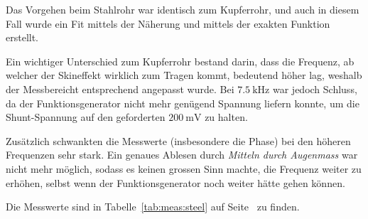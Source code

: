 {\begin{minipage}[t]{0.33\textwidth}
        Das Vorgehen beim Stahlrohr war  identisch zum Kupferrohr, und auch in
        diesem  Fall wurde  ein Fit  mittels  der N\"aherung  und mittels  der
        exakten Funktion erstellt.

        Ein  wichtiger  Unterschied zum  Kupferrohr  bestand  darin, dass  die
        Frequenz,  ab  welcher  der  Skineffekt  wirklich  zum  Tragen  kommt,
        bedeutend h\"oher lag, weshalb der Messbereicht entsprechend angepasst
        wurde. Bei   $\SI{7.5}{\kilo\hertz}$  war   jedoch  Schluss,   da  der
        Funktionsgenerator nicht  mehr gen\"ugend  Spannung liefern konnte, um
        die  Shunt-Spannung  auf  den geforderten  $\SI{200}{\milli\volt}$  zu
        halten.

        Zus\"atzlich  schwankten die  Messwerte (insbesondere  die Phase)  bei
        den  h\"oheren  Frequenzen  sehr   stark. Ein  genaues  Ablesen  durch
        \emph{Mitteln  durch Augenmass}  war nicht  mehr m\"oglich,  sodass es
        keinen grossen Sinn  machte, die Frequenz weiter  zu erh\"ohen, selbst
        wenn der Funktionsgenerator noch weiter h\"atte gehen k\"onnen.

        Die    Messwerte    sind     in    Tabelle~\ref{tab:meas:steel}    auf
        Seite~\pageref{tab:meas:steel} zu finden.

        \vspace{2em}
        \begin{minipage}[c][][b]{0.5\textwidth}
            \vspace{0pt}
            
        \end{minipage}%
        \begin{minipage}[c][][b]{0.5\textwidth}
            \resizebox{\textwidth}{!}{}
            \label{fig:st:freq:sensor}
        \end{minipage}
	\end{minipage}%
	\begin{minipage}[t]{0.67\textwidth}
        \vspace{0pt}
        \resizebox{.95\textwidth}{!}{}
        \label{fig:st:freq:exact}
	\end{minipage}

	\begin{minipage}[t]{0.33\textwidth}
        \vspace{0pt}


\end{minipage}}
